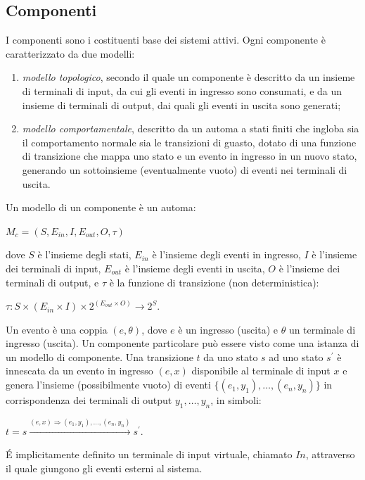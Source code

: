 \subsection{Componenti} 
I componenti sono i costituenti base dei sistemi attivi. Ogni componente è caratterizzato da due modelli:
\begin{enumerate}
\item \emph{modello topologico}, secondo il quale un componente è descritto da un insieme di terminali di input, da cui gli eventi in ingresso sono consumati, e da un insieme di terminali di output, dai quali gli eventi in uscita sono generati;
\item \emph{modello comportamentale}, descritto da un automa a stati finiti che ingloba sia il comportamento normale sia le transizioni di guasto, dotato di una funzione di transizione che mappa uno stato e un evento in ingresso in un nuovo stato, generando un sottoinsieme (eventualmente vuoto) di eventi nei terminali di uscita.  
\end{enumerate}

\begin{defn}
Un modello di un componente è un automa:
\begin{center}
	$M_c = (S,E_{in},I,E_{out},O,\tau)$
\end{center}
dove $S$ è l'insieme degli stati, $E_{in}$ è l'insieme degli eventi in ingresso, $I$ è l'insieme dei terminali di input, $E_{out}$ è l'insieme degli eventi in uscita, $O$ è l'insieme dei terminali di output, e $\tau$ è la funzione di transizione (non deterministica):
\begin{center}
	$ \tau : S \times (E_{in} \times I) \times 2^{(E_{out} \times O)} \rightarrow 2^S $.
\end{center}

Un evento è una coppia $(e,\theta)$, dove $e$ è un ingresso (uscita) e $\theta$ un terminale di ingresso (uscita). Un componente particolare può essere visto come una istanza di un modello di componente. 
Una transizione $t$ da uno stato $s$ ad uno stato $s^\prime$ è innescata da un evento in ingresso $(e,x)$ disponibile al terminale di input $x$ e genera l'insieme (possibilmente vuoto) di eventi 
$\{(e_1,y_1), \ldots ,(e_n,y_n)\}$ in corrispondenza dei terminali di output $y_1, \ldots,y_n$, in simboli:
\begin{center}
	$t = s \xrightarrow {(e,x) \Rightarrow (e_1,y_1), \ldots ,(e_n,y_n)} s^{\prime}$.
\end{center}
\end{defn}
\'E implicitamente definito un terminale di input virtuale, chiamato $In$, attraverso il quale giungono gli eventi esterni al sistema.

